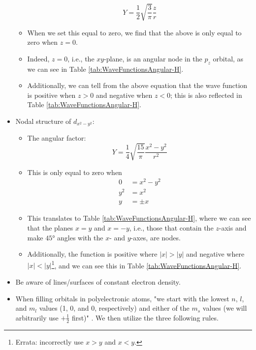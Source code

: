 \documentclass[../notes.tex]{subfiles}
\begin{document}
\begin{itemize}
\begin{itemize}
\begin{equation*}
            Y = \frac{1}{2}\sqrt{\frac{3}{\pi}}\frac{z}{r}
        \end{equation*}
        \item When we set this equal to zero, we find that the above is only equal to zero when $z=0$.
        \item Indeed, $z=0$, i.e., the $xy$-plane, is an angular node in the $p_z$ orbital, as we can see in Table \ref{tab:WaveFunctionsAngular-H}.
        \item Additionally, we can tell from the above equation that the wave function is positive when $z>0$ and negative when $z<0$; this is also reflected in Table \ref{tab:WaveFunctionsAngular-H}.
    \end{itemize}
    \item Nodal structure of $d_{x^2-y^2}$:
    \begin{itemize}
        \item The angular factor:
        \begin{equation*}
            Y = \frac{1}{4}\sqrt{\frac{15}{\pi}}\frac{x^2-y^2}{r^2}
        \end{equation*}
        \item This is only equal to zero when
        \begin{align*}
            0 &= x^2-y^2\\
            y^2 &= x^2\\
            y &= \pm x
        \end{align*}
        \item This translates to Table \ref{tab:WaveFunctionsAngular-H}, where we can see that the planes $x=y$ and $x=-y$, i.e., those that contain the $z$-axis and make $\ang{45}$ angles with the $x$- and $y$-axes, are nodes.
        \item Additionally, the function is positive where $|x|>|y|$ and negative where $|x|<|y|$\footnote{Errata: \textcite{bib:MiesslerFischerTarr} incorrectly use $x>y$ and $x<y$.}, and we can see this in Table \ref{tab:WaveFunctionsAngular-H}.
    \end{itemize}
    \item Be aware of lines/surfaces of constant electron density.
    \item When filling orbitals in polyelectronic atoms, "we start with the lowest $n$, $l$, and $m_l$ values (1, 0, and 0, respectively) and either of the $m_s$ values (we will arbitrarily use $+\frac{1}{2}$ first)" \parencite[26]{bib:MiesslerFischerTarr}. We then utilize the three following rules.
    \begin{itemize}

\end{itemize}
\end{itemize}
\end{document}
